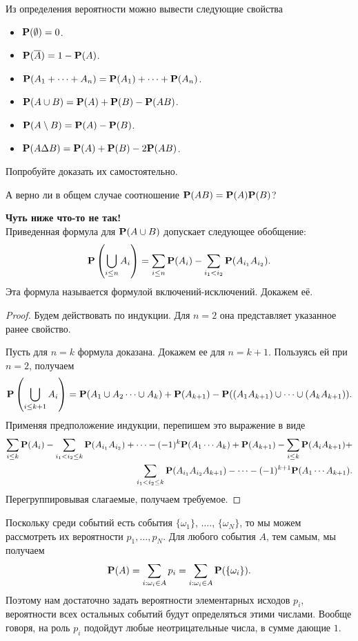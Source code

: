 \documentclass[11 pt,russian]{article}
\begin{document}
Из определения вероятности можно вывести следующие свойства
\begin{itemize}
\item ${\bf P}(\emptyset) = 0$.
\item ${\bf P}(\overline{A}) = 1 - {\bf P}(A)$.
\item ${\bf P}(A_1+ \dotsb + A_n) = {\bf P}(A_1) + \dotsb + {\bf P}(A_n)$.
\item ${\bf P}(A\cup B) = {\bf P}(A) + {\bf P}(B) - {\bf P}(AB)$.
\item ${\bf P}(A\setminus B) = {\bf P}(A) - {\bf P}(B)$.
\item ${\bf P}(A\Delta B) = {\bf P}(A) + {\bf P}(B) - 2{\bf P}(AB)$.
\end{itemize}
Попробуйте доказать их самостоятельно. 
\begin{Que}
А верно ли в общем случае соотношение ${\bf P}(AB) = {\bf P}(A) {\bf P}(B)$?
\end{Que}
{\bf Чуть ниже что-то не так!\\ }
Приведенная формула для ${\bf P}(A\cup B)$ допускает следующее обобщение:
$$
{\bf P}\left(\bigcup_{i\le n} A_i\right) = \sum_{i\le n} {\bf P}(A_i) - \sum_{i_1< i_2} {\bf P}(A_{i_1} A_{i_2}).
$$
Эта формула называется формулой включений-исключений. Докажем её.
\begin{proof}
Будем действовать по индукции. Для $n=2$ она представляет указанное ранее свойство.

Пусть для $n=k$ формула доказана. Докажем ее для $n=k+1$. Пользуясь ей при $n=2$, получаем
$$
{\bf P}\left(\bigcup_{i\le k+1} A_i\right) = 
{\bf P}(A_1\cup A_2 \dotsm \cup A_{k}) + {\bf P}(A_{k+1}) - {\bf P}((A_1 A_{k+1})\cup \dotsm \cup (A_{k}A_{k+1})).
$$
Применяя предположение индукции, перепишем это выражение в виде
\begin{eqnarray*}
 \sum_{i\le k} {\bf P}(A_i) - \sum_{i_1< i_2\le k} {\bf P}(A_{i_1} A_{i_2})  + \dotsb - (-1)^{k} {\bf P}(A_1 \dotsm A_{k}) + {\bf P}(A_{k+1}) - 
 \sum_{i\le k} {\bf P}(A_i A_{k+1}) +\\
  \sum_{i_1< i_2\le k} {\bf P}(A_{i_1} A_{i_2} A_{k+1})  - \dotsb - (-1)^{k+1} {\bf P}(A_1 \dotsm A_{k+1}).
\end{eqnarray*}
Перегруппировывая слагаемые, получаем требуемое.
\end{proof}
Поскольку среди событий есть события $\{\omega_1\}$, $\dotsc$., $\{\omega_N\}$, то мы можем рассмотреть их вероятности $p_1,\dotsc, p_N$. Для любого события $A$, тем самым, мы получаем
$$
{\bf P}(A) = \sum_{i: \omega_i\in A} p_i = \sum_{i: \omega_i\in A} {\bf P}(\{\omega_i\}).
$$
Поэтому нам достаточно задать вероятности элементарных исходов $p_i$, вероятности всех остальных событий будут определяться этими числами. Вообще говоря, на роль $p_i$ подойдут любые неотрицательные числа, в сумме дающие $1$.
\end{document}
